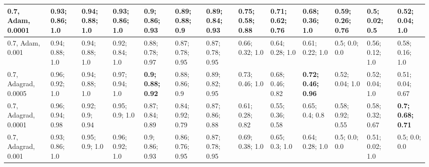 \documentclass{VUMIFPSbakalaurinis}
\begin{document}
\begin{longtable}{ | p{1.5cm} | p{1cm} | p{1cm} | p{1cm} | p{1cm} | p{1cm} | p{1cm} | p{1cm} | p{1cm} | p{1cm} | p{1cm} | p{1cm} | p{1cm} | }
    0.7, Adam, 0.0001     & 0.93; 0.86; 1.0 & 0.94; 0.88; 1.0 & 0.93; 0.86; 1.0   &  0.9; 0.86; 0.93 & 0.89; 0.88; 0.9 & 0.89; 0.84; 0.93    &  0.75; 0.58; 0.88 & 0.71; 0.62; 0.76 & 0.68; 0.36; 1.0           &  0.59; 0.26; 0.76 & 0.5; 0.02; 0.5 & 0.52; 0.04; 1.0  \\ \hline
    0.7, Adam, 0.001      & 0.94; 0.88; 1.0 & 0.94; 0.88; 1.0 & 0.92; 0.84; 1.0   &  0.88; 0.78; 0.97 & 0.87; 0.78; 0.95 & 0.87; 0.78; 0.95  &  0.66; 0.32; 1.0 & 0.64; 0.28; 1.0 & 0.61; 0.22; 1.0             &  0.5; 0.0; 0.0 & 0.56; 0.12; 1.0 & 0.58; 0.16; 1.0  \\ \hline
    0.7, Adagrad, 0.0005  & 0.96; 0.92; 1.0 & 0.94; 0.88; 1.0 & 0.97; 0.94; 1.0   &  \textbf{0.9; 0.88; 0.92} & 0.88; 0.86; 0.9 & 0.89; 0.82; 0.95    &  0.73; 0.46; 1.0 & 0.68; 0.46; 0.82 & \textbf{0.72; 0.46; 0.96}  & 0.52; 0.04; 1.0 & 0.52; 0.04; 1.0 & 0.51; 0.04; 0.67  \\ \hline
    0.7, Adagrad, 0.0001  & 0.96; 0.94; 0.98 & 0.92; 0.9; 0.94 & 0.95; 0.9; 1.0   &  0.87; 0.84; 0.89 & 0.84; 0.92; 0.79 & 0.87; 0.86; 0.88  &  0.61; 0.28; 0.82 & 0.55; 0.36; 0.58 & 0.65; 0.4; 0.8            &  0.58; 0.92; 0.55 & 0.58; 0.32; 0.67 &  \textbf{0.7; 0.68; 0.71}  \\ \hline
    0.7, Adagrad, 0.001   & 0.93; 0.86; 1.0 & 0.95; 0.9; 1.0 & 0.96; 0.92; 1.0    &  0.9; 0.86; 0.93 & 0.86; 0.76; 0.95 & 0.87; 0.78; 0.95   &  0.69; 0.38; 1.0 & 0.65; 0.3; 1.0 & 0.64; 0.28; 1.0              &  0.5; 0.0; 0.0 & 0.51; 0.02; 1.0 & 0.5; 0.0; 0.0  \\ \hline
\end{longtable}
\end{document}

